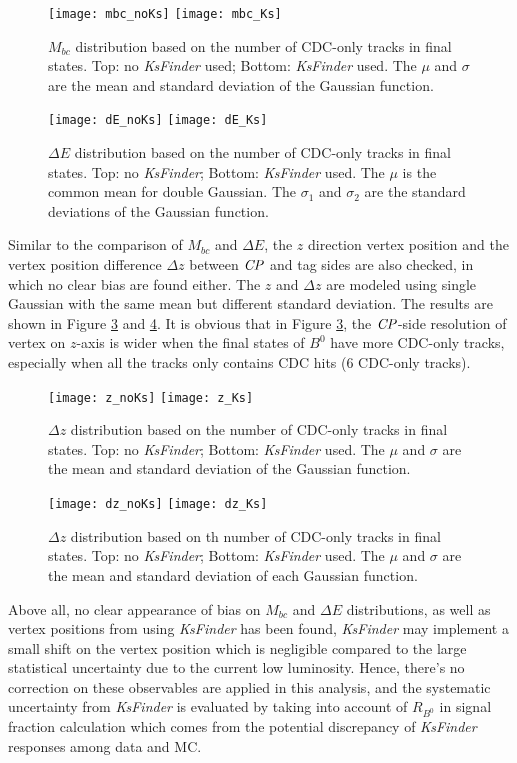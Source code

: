  \begin{figure}[htpb]
 	\centering
 	\texttt{[image: mbc\_noKs]}
 	\texttt{[image: mbc\_Ks]}
 	\caption{$M_{bc}$ distribution based on the number of CDC-only tracks in final states. Top: no \textit{KsFinder} used; Bottom: \textit{KsFinder} used. The $\mu$ and $\sigma$ are the mean and standard deviation of the Gaussian function.}
 	\label{fig:mbc_bias}
 \end{figure}
 \begin{figure}[htpb]
	\centering
	\texttt{[image: dE\_noKs]}
	\texttt{[image: dE\_Ks]}
	\caption{$\Delta{E}$ distribution based on the number of CDC-only tracks in final states. Top: no \textit{KsFinder}; Bottom: \textit{KsFinder} used. The $\mu$ is the common mean for double Gaussian. The $\sigma_1$ and $\sigma_2$ are the standard deviations of the Gaussian function.}
	\label{fig:de_bias}
\end{figure}

Similar to the comparison of $M_{bc}$ and $\Delta{E}$, the $z$ direction vertex position and the vertex position difference $\Delta z$ between $\it{CP}$ and tag sides are also checked, in which no clear bias are found either. The $z$ and $\Delta z$ are modeled using single Gaussian with the same mean but different standard deviation. The results are shown in Figure \ref{fig:bias-z} and \ref{fig:bias-zerr}. It is obvious that in Figure \ref{fig:bias-z}, the $\it{CP}$-side resolution of vertex on $z$-axis is wider when the final states of $B^0$ have more CDC-only tracks, especially when all the tracks only contains CDC hits (6 CDC-only tracks).

\begin{figure}[htpb]
	\centering
	\texttt{[image: z\_noKs]}
	\texttt{[image: z\_Ks]}
	\caption{$\Delta z$ distribution based on the number of CDC-only tracks in final states. Top: no \textit{KsFinder}; Bottom: \textit{KsFinder} used. The $\mu$ and $\sigma$ are the mean and standard deviation of the Gaussian function.}
	\label{fig:bias-z}
\end{figure}
\begin{figure}[htpb]
	\centering
	\texttt{[image: dz\_noKs]}
	\texttt{[image: dz\_Ks]}
	\caption{$\Delta z$ distribution based on th number of CDC-only tracks in final states. Top: no \textit{KsFinder}; Bottom: \textit{KsFinder} used. The $\mu$ and $\sigma$ are the mean and standard deviation of each Gaussian function.}
	\label{fig:bias-zerr}
\end{figure}
Above all, no clear appearance of bias on $M_{bc}$ and $\Delta E$ distributions, as well as vertex positions from using \textit{KsFinder} has been found, \textit{KsFinder} may implement a small shift on the vertex position which is negligible compared to the large statistical uncertainty due to the current low luminosity. Hence, there's no correction on these observables are applied in this analysis, and the systematic uncertainty from \textit{KsFinder} is evaluated by taking into account of $R_{B^0}$ in signal fraction calculation which comes from the potential discrepancy of \textit{KsFinder} responses among data and MC. 